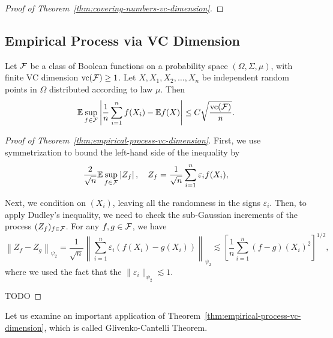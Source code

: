 \begin{proof}[Proof of Theorem~\ref{thm:covering-numbers-vc-dimension}]
\end{proof}

\subsection{Empirical Process via VC Dimension}

\begin{theorem}\label{thm:empirical-process-vc-dimension}
	Let \(\mathcal{F}\) be a class of Boolean functions on a probability space \((\Omega,\Sigma,\mu)\), with finite VC dimension \(\text{vc}(\mathcal{F})\geq 1\). Let \(X,X_{1},X_{2},\ldots,X_{n}\) be independent random points in \(\Omega\) distributed according to law \(\mu\). Then
	\begin{equation*}
		\mathbb{E}\sup_{f\in\mathcal{F}}\left|\frac{1}{n}\sum_{i=1}^{n}f(X_{i})-\mathbb{E} f(X)\right|\leq C\sqrt{\frac{\text{vc}(\mathcal{F})}{n}}.
	\end{equation*}
\end{theorem}

\begin{proof}[Proof of Theorem~\ref{thm:empirical-process-vc-dimension}]
	First, we use symmetrization to bound the left-hand side of the inequality by
	\begin{equation*}
		\frac{2}{\sqrt{n}}\mathbb{E}\sup_{f\in\mathcal{F}}\left|Z_{f}\right|,\quad Z_{f}=\frac{1}{\sqrt{n}}\sum_{i=1}^{n}\varepsilon_{i}f(X_{i}),
	\end{equation*}

	Next, we condition on \((X_{i})\), leaving all the randomness in the signs \(\varepsilon_{i}\). Then, to apply Dudley's inequality, we need to check the sub-Gaussian increments of the process \((Z_{f})_{f\in\mathcal{F}}\). For any \(f,g\in\mathcal{F}\), we have
	\begin{equation*}
		\left\|Z_{f}-Z_{g}\right\|_{\psi_{2}}=\frac{1}{\sqrt{n}}\left\|\sum_{i=1}^{n}\varepsilon_{i}(f(X_{i})-g(X_{i}))\right\|_{\psi_{2}}\lesssim\left[\frac{1}{n}\sum_{i=1}^{n}(f-g)(X_{i})^{2}\right]^{1/2},
	\end{equation*}
	where we used the fact that the \(\|\varepsilon_{i}\|_{\psi_{2}}\lesssim 1\).

	TODO
\end{proof}

Let us examine an important application of Theorem~\ref{thm:empirical-process-vc-dimension}, which is called Glivenko-Cantelli Theorem.

